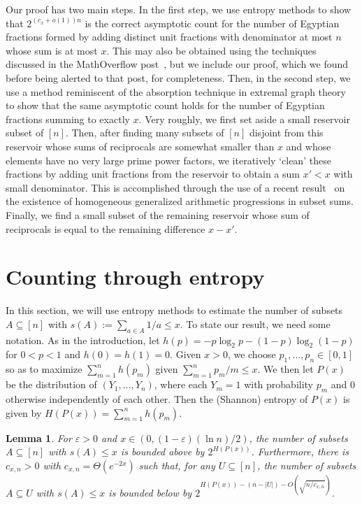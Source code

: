 \documentclass{daj}
\newtheorem{lemma}{Lemma}
\newcommand{\eps}{\varepsilon}
\begin{document}
Our proof has two main steps. In the first step, we use entropy methods to show that $2^{(c_x + o(1))n}$ is the correct asymptotic count for the number of Egyptian fractions formed by adding distinct unit fractions with denominator at most $n$ whose sum is at most $x$. This may also be obtained using the techniques discussed in the MathOverflow post~\cite{T17}, but we include our proof, which we found before being alerted to that post, for completeness. Then, in the second step, we use a method reminiscent of the absorption technique in extremal graph theory to show that the same asymptotic count holds for the number of Egyptian fractions summing to exactly $x$. Very roughly, we first set aside a small reservoir subset of $[n]$. Then, after finding many subsets of $[n]$ disjoint from this reservoir whose sums of reciprocals are somewhat smaller than $x$ and whose elements have no very large prime power factors, we  iteratively `clean' these fractions by adding unit fractions from the reservoir to obtain a sum $x'<x$ with small denominator. This is accomplished through the use of a recent result~\cite{CFP} on the existence of homogeneous generalized arithmetic progressions in subset sums. Finally, we find a small subset of the remaining reservoir whose sum of reciprocals is equal to the remaining difference $x-x'$. 

\section{Counting through entropy}

In this section, we will use entropy methods to estimate the number of subsets $A\subseteq [n]$ with $s(A) := \sum_{a\in A}1/a \le x$. To state our result, we need some notation. As in the introduction, let $h(p)=-p\log_2 p - (1-p)\log_2 (1-p)$ for $0<p<1$ and $h(0)=h(1)=0$. Given $x > 0$, we choose $p_1,\dots,p_n \in [0,1]$ so as to maximize $\sum_{m=1}^{n} h(p_m)$ given $\sum_{m=1}^{n} p_m/m \le x$. We then let $P(x)$ be the distribution of $(Y_1,\dots,Y_n)$, where each $Y_m=1$ with probability $p_m$ and $0$ otherwise independently of each other. Then the (Shannon) entropy of $P(x)$ is given by $H(P(x)) = \sum_{m=1}^{n}h(p_m)$.

\begin{lemma}\label{lem:main-ent}
    For $\eps>0$ and $x \in (0,(1-\eps)(\ln n)/2)$, the number of subsets $A\subseteq [n]$ with $s(A) \le x$ is bounded above by $2^{H(P(x))}$. 
    Furthermore, there is $c_{x,n}>0$ with $c_{x,n} = \Theta(e^{-2x})$ such that, for any $U \subseteq [n]$, the number of subsets $A\subseteq U$ with $s(A) \le x$ is bounded below by $2^{H(P(x)) - (n-|U|) - O(\sqrt{n/c_{x,n}})}$.
\end{lemma}
\end{document}
